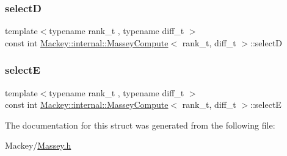 \mbox{\label{structMackey_1_1internal_1_1MasseyCompute_ae003114601c96c989535d8d667b5377b}} 
\subsubsection{\texorpdfstring{selectD}{selectD}}
{\footnotesize\ttfamily template$<$typename rank\+\_\+t , typename diff\+\_\+t $>$ \\
const int \hyperlink{structMackey_1_1internal_1_1MasseyCompute}{Mackey\+::internal\+::\+Massey\+Compute}$<$ rank\+\_\+t, diff\+\_\+t $>$\+::selectD}

\mbox{\label{structMackey_1_1internal_1_1MasseyCompute_a49059bf5d09cb277091097d2ee680b05}} 
\subsubsection{\texorpdfstring{selectE}{selectE}}
{\footnotesize\ttfamily template$<$typename rank\+\_\+t , typename diff\+\_\+t $>$ \\
const int \hyperlink{structMackey_1_1internal_1_1MasseyCompute}{Mackey\+::internal\+::\+Massey\+Compute}$<$ rank\+\_\+t, diff\+\_\+t $>$\+::selectE}



The documentation for this struct was generated from the following file\+:\begin{DoxyCompactItemize}
\item 
Mackey/\hyperlink{Massey_8h}{Massey.\+h}\end{DoxyCompactItemize}
